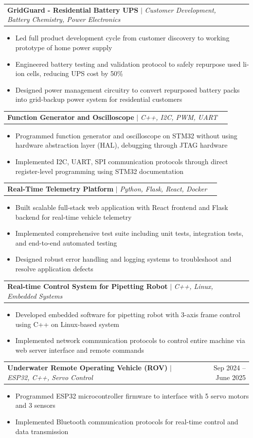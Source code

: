 \documentclass[letterpaper,11pt]{article}
\makeatletter
\newcommand{\resumeItem}[1]{
  \item\small{
    {#1 \vspace{-2pt}}
  }
}
\newcommand{\resumeProjectHeading}[2]{
    \item
    \begin{tabular*}{0.97\textwidth}{l@{\extracolsep{\fill}}r}
      \small#1 & #2 \\
    \end{tabular*}\vspace{-7pt}
}
\newcommand{\resumeItemListStart}{\begin{itemize}}
\newcommand{\resumeItemListEnd}{\end{itemize}\vspace{-5pt}}
\makeatother
\begin{document}
        \resumeProjectHeading
          {\textbf{GridGuard - Residential Battery UPS} $|$ \emph{Customer Development, Battery Chemistry, Power Electronics}}{}
          \resumeItemListStart
            \resumeItem{Led full product development cycle from customer discovery to working prototype of home power supply}
            \resumeItem{Engineered battery testing and validation protocol to safely repurpose used li-ion cells, reducing UPS cost by 50\%}
            \resumeItem{Designed power management circuitry to convert repurposed battery packs into grid-backup power system for residential customers}
          \resumeItemListEnd

        \resumeProjectHeading
          {\textbf{Function Generator and Oscilloscope} $|$ \emph{C++, I2C, PWM, UART}}{}
          \resumeItemListStart
            \resumeItem{Programmed function generator and oscilloscope on STM32 without using hardware abstraction layer (HAL), debugging through JTAG hardware}
            \resumeItem{Implemented I2C, UART, SPI communication protocols through direct register-level programming using STM32 documentation}
          \resumeItemListEnd

        \resumeProjectHeading
          {\textbf{Real-Time Telemetry Platform} $|$ \emph{Python, Flask, React, Docker}}{}
          \resumeItemListStart
            \resumeItem{Built scalable full-stack web application with React frontend and Flask backend for real-time vehicle telemetry}
            \resumeItem{Implemented comprehensive test suite including unit tests, integration tests, and end-to-end automated testing}
            \resumeItem{Designed robust error handling and logging systems to troubleshoot and resolve application defects}
          \resumeItemListEnd

          \resumeProjectHeading
          {\textbf{Real-time Control System for Pipetting Robot} $|$ \emph{C++, Linux, Embedded Systems}}{}
          \resumeItemListStart
            \resumeItem{Developed embedded software for pipetting robot with 3-axis frame control using C++ on Linux-based system}
            \resumeItem{Implemented network communication protocols to control entire machine via web server interface and remote commands}
          \resumeItemListEnd

          \resumeProjectHeading
          {\textbf{Underwater Remote Operating Vehicle (ROV)} $|$ \emph{ESP32, C++, Servo Control}}{Sep 2024 -- June 2025}
          \resumeItemListStart
            \resumeItem{Programmed ESP32 microcontroller firmware to interface with 5 servo motors and 3 sensors}
            \resumeItem{Implemented Bluetooth communication protocols for real-time control and data transmission}
          \resumeItemListEnd
\end{document}
